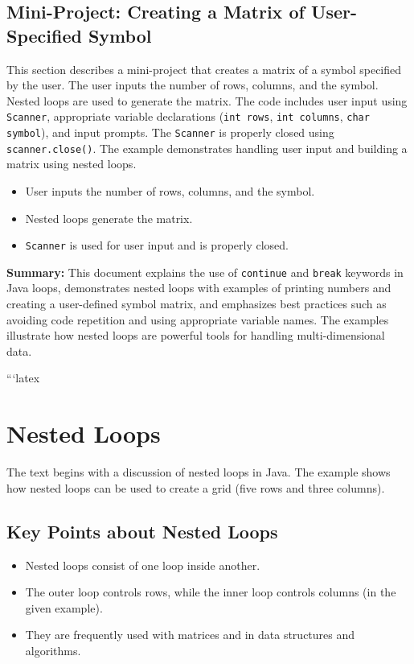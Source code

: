 \documentclass{article}
\begin{document}
\subsection{Mini-Project: Creating a Matrix of User-Specified Symbol}

This section describes a mini-project that creates a matrix of a symbol specified by the user.  The user inputs the number of rows, columns, and the symbol.  Nested loops are used to generate the matrix.  The code includes user input using \texttt{Scanner}, appropriate variable declarations (\texttt{int rows}, \texttt{int columns}, \texttt{char symbol}), and input prompts.  The \texttt{Scanner} is properly closed using \texttt{scanner.close()}. The example demonstrates handling user input and building a matrix using nested loops.

\begin{itemize}
    \item User inputs the number of rows, columns, and the symbol.
    \item Nested loops generate the matrix.
    \item \texttt{Scanner} is used for user input and is properly closed.
\end{itemize}


\textbf{Summary:} This document explains the use of \texttt{continue} and \texttt{break} keywords in Java loops, demonstrates nested loops with examples of printing numbers and creating a user-defined symbol matrix, and emphasizes best practices such as avoiding code repetition and using appropriate variable names.  The examples illustrate how nested loops are powerful tools for handling multi-dimensional data.


```latex
\section{Nested Loops}

The text begins with a discussion of nested loops in Java.  The example shows how nested loops can be used to create a grid (five rows and three columns).

\subsection{Key Points about Nested Loops}

\begin{itemize}
    \item Nested loops consist of one loop inside another.
    \item The outer loop controls rows, while the inner loop controls columns (in the given example).
    \item They are frequently used with matrices and in data structures and algorithms.
\end{itemize}
\end{document}

